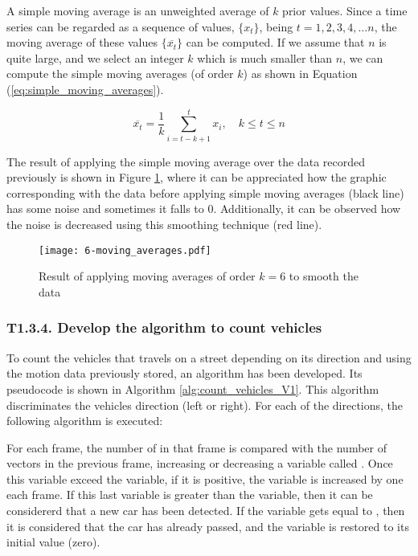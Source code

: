 A simple moving average \cite{Smi15} is an unweighted average of $k$ prior values. Since a time series can be regarded as a sequence of values, $\{x_{t}\}$, being $t=1,2,3,4,…n$, the moving average of these values $\{\overline {x_{t}}\}$ can be computed. If we assume that $n$ is quite large, and we select an integer $k$ which is much smaller than $n$, we can compute the simple moving averages (of order $k$) as shown in Equation (\ref{eq:simple_moving_averages}).

\begin{equation} \label{eq:simple_moving_averages}
\overline { { x }_{ t } } =\frac { 1 }{ k } \sum _{ i=t-k+1 }^{ t }{ { x }_{ i } } ,\quad k\le t\le n
\end{equation}

The result of applying the simple moving average over the data recorded previously is shown in Figure \ref{fig:6-moving_averages}, where it can be appreciated how the graphic corresponding with the data before applying simple moving averages (black line) has some noise and sometimes it falls to 0. Additionally, it can be observed how the noise is decreased using this smoothing technique (red line).

\begin{figure}[!h]
	\begin{center}
		\texttt{[image: 6-moving\_averages.pdf]}
		\caption{Result of applying moving averages of order $k = 6$ to smooth the data}
		\label{fig:6-moving_averages}
	\end{center}
\end{figure}


\subsubsection{T1.3.4. Develop the algorithm to count vehicles}
To count the vehicles that travels on a street depending on its direction and using the motion data previously stored, an algorithm has been developed. Its pseudocode is shown in Algorithm \ref{alg:count_vehicles_V1}. This algorithm discriminates the vehicles direction (left or right). For each of the directions, the following algorithm is executed: 

For each frame, the number of  in that frame is compared with the number of vectors in the previous frame, increasing or decreasing a variable called . Once this variable exceed the  variable, if it is positive, the variable  is increased by one each frame. If this last variable is greater than the  variable, then it can be considererd that a new car has been detected. If the  variable gets equal to , then it is considered that the car has already passed, and the variable  is restored to its initial value (zero).


